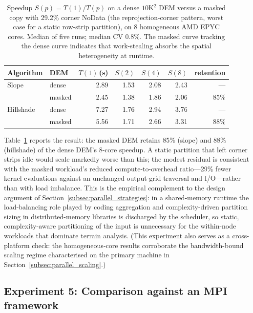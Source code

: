 \documentclass[preprint,review,12pt,authoryear]{elsarticle}
\newif\ifmarkedrev
\newcommand{\revtext}[1]{\ifmarkedrev\textcolor{blue}{#1}\else#1\fi}
\begin{document}
\begin{table}[htbp]
\centering
\caption{\revtext{Speedup $S(p)=T(1)/T(p)$ on a dense $10\text{K}^2$ DEM versus a masked copy with 29.2\% corner NoData (the reprojection-corner pattern, worst case for a static row-strip partition), on 8 homogeneous AMD EPYC cores. Median of five runs; median CV $0.8\%$. The masked curve tracking the dense curve indicates that work-stealing absorbs the spatial heterogeneity at runtime.}}
\label{tab:nodata_heterogeneity}
\begin{tabular}{@{}llrrrrr@{}}
\toprule
Algorithm & DEM & $T(1)$\,(s) & $S(2)$ & $S(4)$ & $S(8)$ & retention \\
\midrule
Slope     & dense  & 2.89 & 1.53 & 2.08 & 2.43 & --- \\
          & masked & 2.45 & 1.38 & 1.86 & 2.06 & 85\% \\
Hillshade & dense  & 7.27 & 1.76 & 2.94 & 3.76 & --- \\
          & masked & 5.56 & 1.71 & 2.66 & 3.31 & 88\% \\
\bottomrule
\end{tabular}
\end{table}

\revtext{Table~\ref{tab:nodata_heterogeneity} reports the result: the masked DEM retains 85\% (slope) and 88\% (hillshade) of the dense DEM's 8-core speedup. A static partition that left corner strips idle would scale markedly worse than this; the modest residual is consistent with the masked workload's reduced compute-to-overhead ratio---29\% fewer kernel evaluations against an unchanged output-grid traversal and I/O---rather than with load imbalance. This is the empirical complement to the design argument of Section~\ref{subsec:parallel_strategies}: in a shared-memory runtime the load-balancing role played by coding aggregation and complexity-driven partition sizing in distributed-memory libraries \citep{qin2014strategy, wang2021loadbalancing} is discharged by the scheduler, so static, complexity-aware partitioning of the input is unnecessary for the within-node workloads that dominate terrain analysis. (This experiment also serves as a cross-platform check: the homogeneous-core results corroborate the bandwidth-bound scaling regime characterised on the primary machine in Section~\ref{subsec:parallel_scaling}.)}

\subsection{\revtext{Experiment 5: Comparison against an MPI framework}}
\label{subsec:taudem_mpi}
\end{document}
